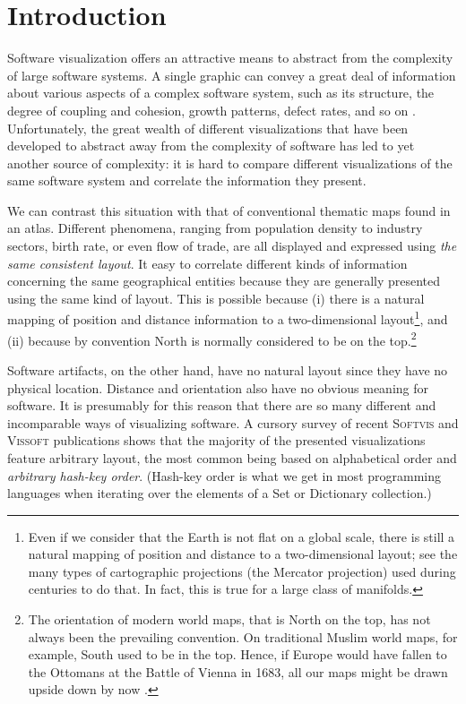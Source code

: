 \chapter{Introduction}


Software visualization offers an attractive means to abstract from the complexity of large software systems.
A single graphic can convey a great deal of information about various aspects of a complex software system, such as its structure, the degree of coupling and cohesion, growth patterns, defect rates, and so on \cite{Dieh07a,Kien07a,Reis05a,Stor05a}.
Unfortunately, the great wealth of different visualizations that have been developed to abstract away from the complexity of software has led to yet another source of complexity: it is hard to compare different visualizations of the same software system and correlate the information they present.

We can contrast this situation with that of conventional thematic maps found in an atlas.
Different phenomena, ranging from population density to industry sectors, birth rate, or even flow of trade, are all displayed and expressed using \emph{the same consistent layout}.
It easy to correlate different kinds of information concerning the same geographical entities because they are generally presented using the same kind of layout.
This is possible because (i) there is a natural mapping of position and distance information to a two-dimensional layout\footnote{Even if we consider that the Earth is not flat on a global scale, there is still a natural mapping of position and distance to a two-dimensional layout; see the many types of cartographic projections (\eg the Mercator projection) used during centuries to do that. In fact, this is true for a large class of manifolds.}, and (ii) because by convention North is normally considered to be on the top.\footnote{The orientation of modern world maps, that is North on the top, has not always been the prevailing convention. On traditional Muslim world maps, for example, South used to be in the top. Hence, if Europe would have fallen to the Ottomans at the Battle of Vienna in 1683, all our maps might be drawn upside down by now \cite{Hite99a}.}

Software artifacts, on the other hand, have no natural layout since they have no physical location.
Distance and orientation also have no obvious meaning for software.
It is presumably for this reason that there are so many different and incomparable ways of visualizing software.
A cursory survey of recent \textsc{Softvis} and \textsc{Vissoft} publications shows that the majority of the presented visualizations feature arbitrary layout, the most common being based on alphabetical order and \emph{arbitrary hash-key order}.
(Hash-key order is what we get in most programming languages when iterating over the elements of a Set or Dictionary collection.)

